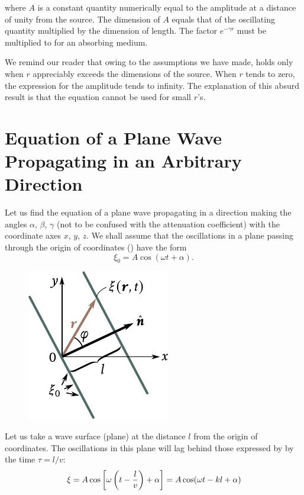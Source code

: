 \noindent
where $A$ is a constant quantity numerically equal to the amplitude at a distance of unity from the source.
The dimension of $A$ equals that of the oscillating quantity multiplied by the dimension of length.
The factor $e^{-\gamma r}$ must be multiplied to  for an absorbing medium.

We remind our reader that owing to the assumptions we have made,  holds only when $r$ appreciably exceeds the dimensions of the source. When $r$ tends to zero, the expression for the amplitude tends to infinity.
The explanation of this absurd result is that the equation cannot be used for small $r$'s.

\section{Equation of a Plane Wave Propagating in an Arbitrary Direction}\label{sec:14_3}

Let us find the equation of a plane wave propagating in a direction making the angles $\alpha$, $\beta$, $\gamma$ (not to be confused with the attenuation coefficient) with the coordinate axes $x$, $y$, $z$.
We shall assume that the oscillations in a plane passing through the origin of coordinates () have the form
\begin{equation}\label{eq:14_13}
    \xi_0 = A \cos(\omega t + \alpha).
\end{equation}

\begin{figure}[t]
	\begin{center}
		\includegraphics[scale=1]{figures/ch_14/fig_14_5.pdf}
		\caption[]{}
		\label{fig:14_5}
	\end{center}
	\vspace{-0.8cm}
\end{figure}

\noindent
Let us take a wave surface (plane) at the distance $l$ from the origin of coordinates.
The oscillations in this plane will lag behind those expressed by  by the time $\tau=l/v$:
\begin{equation}\label{eq:14_14}
    \xi = A \cos\left[ \omega \left(t - \frac{l}{v}\right) + \alpha\right] = A \cos(\omega t - kl + \alpha)
\end{equation}

